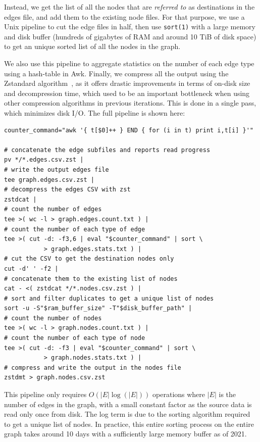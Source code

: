 Instead, we get the list of all the nodes that are \emph{referred to} as
destinations in the edges file, and add them to the existing node files. For
that purpose, we use a Unix pipeline to cut the edge files in half, then use
\texttt{sort(1)} with a large memory and disk buffer (hundreds of gigabytes of
RAM and around 10 TiB of disk space) to get an unique sorted list of all the
nodes in the graph.

We also use this pipeline to aggregate statistics on the number of each edge
type using a hash-table in Awk. Finally, we compress all the output using the
Zstandard algorithm~\cite{collet2015zstd}, as it offers drastic improvements in
terms of on-disk size and decompression time, which used to be an important
bottleneck when using other compression algorithms in previous iterations. This
is done in a single pass, which minimizes disk I/O. The full pipeline is shown
here:

\begin{verbatim}
counter_command="awk '{ t[$0]++ } END { for (i in t) print i,t[i] }'"

# concatenate the edge subfiles and reports read progress
pv */*.edges.csv.zst |
# write the output edges file
tee graph.edges.csv.zst |
# decompress the edges CSV with zst
zstdcat |
# count the number of edges
tee >( wc -l > graph.edges.count.txt ) |
# count the number of each type of edge
tee >( cut -d: -f3,6 | eval "$counter_command" | sort \
           > graph.edges.stats.txt ) |
# cut the CSV to get the destination nodes only
cut -d' ' -f2 |
# concatenate them to the existing list of nodes
cat - <( zstdcat */*.nodes.csv.zst ) |
# sort and filter duplicates to get a unique list of nodes
sort -u -S"$ram_buffer_size" -T"$disk_buffer_path" |
# count the number of nodes
tee >( wc -l > graph.nodes.count.txt ) |
# count the number of each type of node
tee >( cut -d: -f3 | eval "$counter_command" | sort \
           > graph.nodes.stats.txt ) |
# compress and write the output in the nodes file
zstdmt > graph.nodes.csv.zst
\end{verbatim}

This pipeline only requires $O(|E| \log(|E|))$ operations where $|E|$ is the
number of edges in the graph, with a small constant factor as the source data
is read only once from disk. The log term is due to the sorting algorithm
required to get a unique list of nodes. In practice, this entire sorting
process on the entire graph takes around 10 days with a sufficiently large
memory buffer as of 2021.

